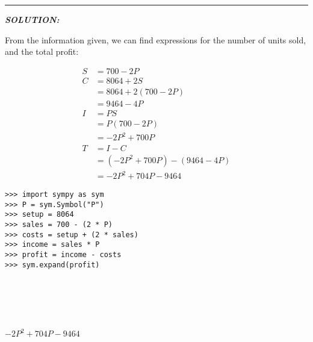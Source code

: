 \documentclass[12pt]{article}
\begin{document}
\vspace{5mm}
\hrule
\vspace{5mm}

\textbf{\textit{SOLUTION:}}

\vspace{5mm}

\begin{mdframed}[linewidth=0.5mm, backgroundcolor=orange!10]
From the information given, we can find expressions for the number of units sold, and the total profit:
\end{mdframed}

\begin{minipage}[t]{.6\textwidth} %
\begin{mdframed}[linewidth=0.5mm, backgroundcolor=cyan!10]
\vspace{-3mm}
\small{%
\begin{align*}
S &= 700 - 2P \\[2mm]
C &= 8064 + 2S \\
&= 8064 + 2(700 - 2P)\\
&= 9464 - 4P \\[2mm]
I &= PS \\
&= P(700 - 2P) \\
&= -2P^2 + 700P \\[2mm]
T &= I - C \\
&= (-2P^2 + 700P) - (9464 - 4P) \\
&= -2P^2 + 704P - 9464
\end{align*}%
}
\end{mdframed}
\end{minipage} %
\begin{minipage}[t]{.4\textwidth} %
\begin{verbatim}
>>> import sympy as sym
>>> P = sym.Symbol("P")
>>> setup = 8064
>>> sales = 700 - (2 * P)
>>> costs = setup + (2 * sales)
>>> income = sales * P
>>> profit = income - costs
>>> sym.expand(profit)






\end{verbatim}
\vspace{-3.7cm}

\hspace{0.5cm}\begin{minipage}{\textwidth}$-2P^{2} + 704P - 9464$\end{minipage}
\end{minipage}

\vspace{0.5cm}
\end{document}
